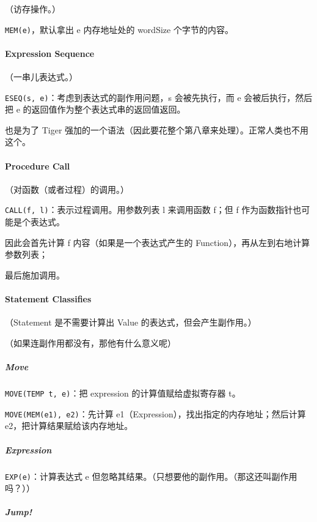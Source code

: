 \documentclass[
]{article}
\begin{document}
（访存操作。）

\texttt{MEM(e)}，默认拿出 e 内存地址处的 wordSize 个字节的内容。

\hypertarget{header-n44}{%
\paragraph{Expression Sequence}\label{header-n44}}

（一串儿表达式。）

\texttt{ESEQ(s,\ e)}：考虑到表达式的副作用问题，s 会被先执行，而 e
会被后执行，然后把 e 的返回值作为整个表达式串的返回值返回。

也是为了 Tiger
强加的一个语法（因此要花整个第八章来处理）。正常人类也不用这个。

\hypertarget{header-n48}{%
\paragraph{Procedure Call}\label{header-n48}}

（对函数（或者过程）的调用。）

\texttt{CALL(f,\ l)}：表示过程调用。用参数列表 l 来调用函数 f；但 f
作为函数指针也可能是个表达式。

因此会首先计算 f 内容（如果是一个表达式产生的
Function），再从左到右地计算参数列表；

最后施加调用。

\hypertarget{header-n53}{%
\paragraph{Statement Classifies}\label{header-n53}}

（Statement 是不需要计算出 Value 的表达式，但会产生副作用。）

（如果连副作用都没有，那他有什么意义呢）

\hypertarget{header-n56}{%
\subparagraph{Move}\label{header-n56}}

\texttt{MOVE(TEMP\ t,\ e)}：把 expression 的计算值赋给虚拟寄存器 t。

\texttt{MOVE(MEM(e1),\ e2)}：先计算
e1（Expression），找出指定的内存地址；然后计算
e2，把计算结果赋给该内存地址。

\hypertarget{header-n59}{%
\subparagraph{Expression}\label{header-n59}}

\texttt{EXP(e)}：计算表达式 e
但忽略其结果。（只想要他的副作用。（那这还叫副作用吗？））

\hypertarget{header-n61}{%
\subparagraph{Jump!}\label{header-n61}}
\end{document}
